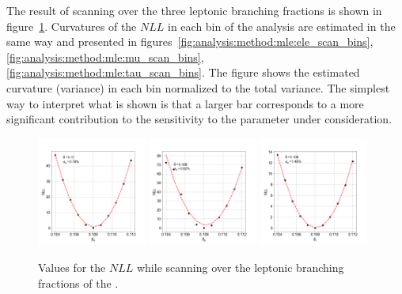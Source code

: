 The result of scanning over the three leptonic branching fractions is shown in figure~\ref{fig:analysis:method:mle:beta_scan_1D}.  Curvatures of the $NLL$ in each bin of the analysis are estimated in the same way and presented in figures~\ref{fig:analysis:method:mle:ele_scan_bins}, \ref{fig:analysis:method:mle:mu_scan_bins}, \ref{fig:analysis:method:mle:tau_scan_bins}. The figure shows the estimated curvature (variance) in each bin normalized to the total variance.  The simplest way to interpret what is shown is that a larger bar corresponds to a more significant contribution to the sensitivity to the parameter under consideration.

\begin{figure}[h]
    \centering
    \includegraphics[width=0.32\textwidth]{chapters/Analysis/sectionStatisticalAnalysis/figures/beta_e}
    \includegraphics[width=0.32\textwidth]{chapters/Analysis/sectionStatisticalAnalysis/figures/beta_mu}
    \includegraphics[width=0.32\textwidth]{chapters/Analysis/sectionStatisticalAnalysis/figures/beta_tau}
    \caption{Values for the $NLL$ while scanning over the leptonic branching fractions of the \PW.}
    \label{fig:analysis:method:mle:beta_scan_1D}
\end{figure}

